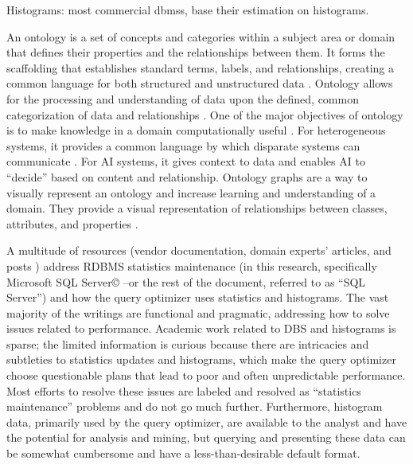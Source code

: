 \documentclass[sigconf]{acmart}
\begin{document}
Histograms: most commercial dbmss, base their estimation on histograms. 

An ontology is a set of concepts and categories within a subject area or domain that defines their properties and the relationships between them. It forms the scaffolding that establishes standard terms, labels, and relationships, creating a common language for both structured and unstructured data \cite{gruber1993ontology, chari2020explanation}. Ontology allows for the processing and understanding of data upon the defined, common categorization of data and relationships \cite{yue2024csm}. One of the major objectives of ontology is to make knowledge in a domain computationally useful \cite{tudorache2020ontology}. For heterogeneous systems, it provides a common language by which disparate systems can communicate \cite{fraga2020ontology, yue2024csm}. For AI systems, it gives context to data and enables AI to “decide” based on content and relationship. Ontology graphs are a way to visually represent an ontology and increase learning and understanding of a domain. They provide a visual representation of relationships between classes, attributes, and properties \cite{gutierrez2018knowledge, yue2021applying}.

A multitude of resources (vendor documentation, domain experts' articles, and posts \cite{RWesta, RWestb, RWestc}) address RDBMS statistics maintenance (in this research, specifically Microsoft SQL Server© --or the rest of the document, referred to as “SQL Server”) and how the query optimizer uses statistics and histograms. The vast majority of the writings are functional and pragmatic, addressing how to solve issues related to performance. Academic work related to DBS and histograms is sparse; the limited information is curious because there are intricacies and subtleties to statistics updates and histograms, which make the query optimizer choose questionable plans that lead to poor and often unpredictable performance. Most efforts to resolve these issues are labeled and resolved as “statistics maintenance” problems and do not go much further. Furthermore, histogram data, primarily used by the query optimizer, are available to the analyst and have the potential for analysis and mining, but querying and presenting these data can be somewhat cumbersome and have a less-than-desirable default format.
\end{document}

